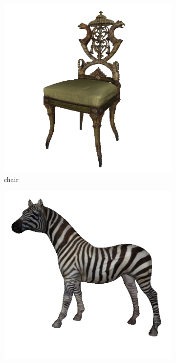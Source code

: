 \begin{figure}[!h]
	\begin{subfigure}[b]{0.24\linewidth}
		\includegraphics[width=\linewidth]{./Figures/train-dataset/08.pergolesi-side-chair_texture.png}
		\caption{chair}
	\end{subfigure}
	\begin{subfigure}[b]{0.24\linewidth}
		\includegraphics[width=\linewidth]{./Figures/train-dataset/42.zebra_texture.png}

\end{subfigure}
\end{figure}

